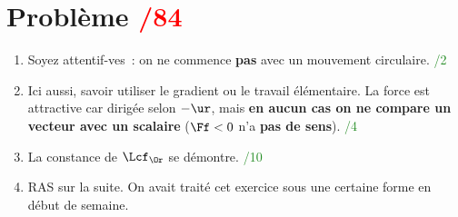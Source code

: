 \documentclass[a4paper, 10pt, final, garamond]{book}
\begin{document}
\section{Problème \hfill \textcolor{red}{/84}}
\begin{enumerate}
    \item Soyez attentif-ves~: on ne commence \textbf{pas} avec un mouvement
      circulaire.
    \hfill \textcolor{ForestGreen}{/2}
    \item Ici aussi, savoir utiliser le gradient ou le travail élémentaire. La
      force est attractive car dirigée selon $-\ur$, mais \textbf{en aucun cas
      on ne compare un vecteur avec un scalaire} ($\Ff < 0$ n'a \textbf{pas de
      sens}).
    \hfill \textcolor{ForestGreen}{/4}
    \item La constance de $\Lcf_{\Or}$ se démontre.
    \hfill \textcolor{ForestGreen}{/10}
    \item RAS sur la suite. On avait traité cet exercice sous une certaine
      forme en début de semaine.
\end{enumerate}
\end{document}
